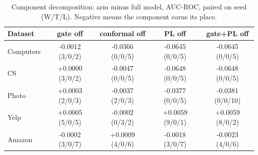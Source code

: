 \begin{table}[t]
\centering
\small
\begin{tabular}{lcccc}
\toprule
Dataset & gate off & conformal off & PL off & gate+PL off \\
\midrule
Computers & -0.0012 (3/0/2) & -0.0366 (0/0/5) & -0.0645 (0/0/5) & -0.0645 (0/0/5) \\
CS & +0.0000 (3/0/2) & -0.0047 (0/0/5) & -0.0648 (0/0/5) & -0.0648 (0/0/5) \\
Photo & +0.0003 (2/0/3) & -0.0037 (2/0/3) & -0.0377 (0/0/5) & -0.0381 (0/0/10) \\
Yelp & +0.0005 (5/0/5) & -0.0002 (0/3/2) & +0.0059 (9/0/1) & +0.0059 (8/0/2) \\
Amazon & -0.0002 (3/0/7) & +0.0009 (4/0/6) & -0.0018 (3/0/7) & -0.0023 (4/0/6) \\
\bottomrule
\end{tabular}
\caption{Component decomposition: arm minus full model, AUC-ROC, paired on seed (W/T/L). Negative means the component earns its place.}
\label{tab:decomposition}
\end{table}
